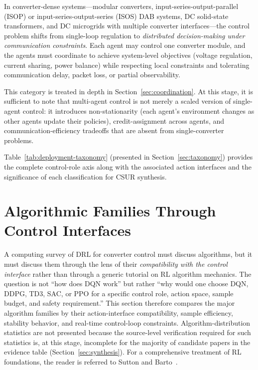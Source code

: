 \documentclass[manuscript,screen,review]{acmart}
\begin{document}
In converter-dense systems---modular converters, input-series-output-parallel (ISOP) or input-series-output-series (ISOS) DAB systems, DC solid-state transformers, and DC microgrids with multiple converter interfaces---the control problem shifts from single-loop regulation to \emph{distributed decision-making under communication constraints}.
Each agent may control one converter module, and the agents must coordinate to achieve system-level objectives (voltage regulation, current sharing, power balance) while respecting local constraints and tolerating communication delay, packet loss, or partial observability.

This category is treated in depth in Section~\ref{sec:coordination}.
At this stage, it is sufficient to note that multi-agent control is not merely a scaled version of single-agent control: it introduces non-stationarity (each agent's environment changes as other agents update their policies), credit-assignment across agents, and communication-efficiency tradeoffs that are absent from single-converter problems.

Table~\ref{tab:deployment-taxonomy} (presented in Section~\ref{sec:taxonomy}) provides the complete control-role axis along with the associated action interfaces and the significance of each classification for CSUR synthesis.

\section{Algorithmic Families Through Control Interfaces}
\label{sec:algorithms}

A computing survey of DRL for converter control must discuss algorithms, but it must discuss them through the lens of their \emph{compatibility with the control interface} rather than through a generic tutorial on RL algorithm mechanics.
The question is not ``how does DQN work'' but rather ``why would one choose DQN, DDPG, TD3, SAC, or PPO for a specific control role, action space, sample budget, and safety requirement.''
This section therefore compares the major algorithm families by their action-interface compatibility, sample efficiency, stability behavior, and real-time control-loop constraints.
Algorithm-distribution statistics are not presented because the source-level verification required for such statistics is, at this stage, incomplete for the majority of candidate papers in the evidence table (Section~\ref{sec:synthesis}).
For a comprehensive treatment of RL foundations, the reader is referred to Sutton and Barto~\cite{sutton2018reinforcement}.
\end{document}
